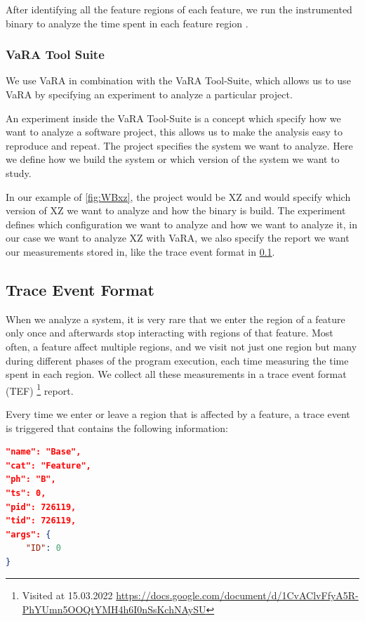 After identifying all the feature regions of each feature, we run the instrumented binary to analyze the time 
spent in each feature region \cite{VaRA-Flo}.


\subsubsection{VaRA Tool Suite}
We use VaRA in combination with the VaRA Tool-Suite, which allows us to use VaRA by specifying an experiment to analyze a particular project. 

An experiment inside the VaRA Tool-Suite is a concept which specify how we want to analyze a software project, this allows us to make the analysis
easy to reproduce and repeat.
The project specifies the system we want to analyze. Here we define how we build the system or which version of the system we want to study. 

In our example of \autoref{fig:WBxz}, the project would be XZ and would specify which version of XZ we want to analyze and how the binary is build.
The experiment defines which configuration we want to analyze and how we want to analyze it, in our case we want to analyze 
XZ with VaRA, we also specify the report we want our measurements stored in, like the trace event format in \ref{trace-event}.

\subsection{Trace Event Format}\label{trace-event}
When we analyze a system, it is very rare that we enter the region of a feature only once and afterwards stop interacting with regions of that feature. 
Most often, a feature affect multiple regions, and we visit not just one region but many during different phases of the program execution,
each time measuring the time spent in each region.
We collect all these measurements
in a trace event format (TEF) \footnote{Visited at 15.03.2022 \url{https://docs.google.com/document/d/1CvAClvFfyA5R-PhYUmn5OOQtYMH4h6I0nSsKchNAySU}} report.

Every time we enter or leave a region that is affected by a feature, a trace event is triggered that contains the following information:

\begin{lstlisting}[caption={Trace event},captionpos=b,language=json,firstnumber=1,label={event}]
"name": "Base",
"cat": "Feature",
"ph": "B",
"ts": 0,
"pid": 726119,
"tid": 726119,
"args": {
    "ID": 0
}\end{lstlisting}
    
